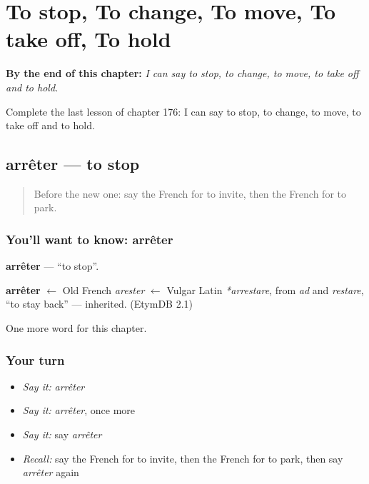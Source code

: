 
\chapter{To stop, To change, To move, To take off, To hold}
\label{ch:fr-to-stop-to-change-to-move-to-take-off-to-hold}

\begin{chapteropening}
\textbf{By the end of this chapter:} \emph{I can say to stop, to change, to move, to take off and to hold.}

Complete the last lesson of chapter 176: I can say to stop, to change, to move, to take off and to hold.
\end{chapteropening}

\section[arrêter]{arrêter — to stop}

\label{lesson:FR-C176-arreter}



\begin{quote}
Before the new one: say the French for to invite, then the French for to park.
\end{quote}

\subsection*{You'll want to know: arrêter}
\textbf{arrêter} — \textquotedblleft{}to stop\textquotedblright{}.

\begin{cousinweb}
\textbf{arrêter} $\leftarrow$ Old French \emph{arester} $\leftarrow$ Vulgar Latin \emph{*arrestare}, from \emph{ad} and \emph{restare}, \textquotedblleft{}to stay back\textquotedblright{} — inherited. (EtymDB 2.1)
\end{cousinweb}

\begin{grammarlens}[title={What you've built}]
One more word for this chapter.
\end{grammarlens}

\subsection*{Your turn}
\begin{itemize}
\raggedright
  \item \emph{Say it:} \emph{arrêter}
  \item \emph{Say it:} \emph{arrêter}, once more
  \item \emph{Say it:} say \emph{arrêter}
  \item \emph{Recall:} say the French for to invite, then the French for to park, then say \emph{arrêter} again
\end{itemize}

